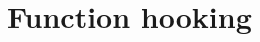 \documentclass{report}
\begin{document}
\section{Function hooking}
\label{sec:detection:function-hooking}




\end{document}
